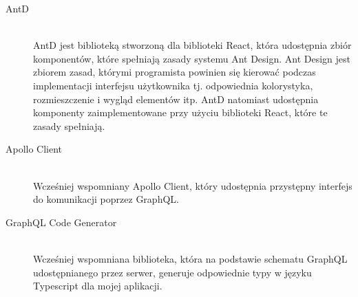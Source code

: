\begin{description}
  \item[AntD] \hfill \\ AntD jest biblioteką stworzoną dla biblioteki React, która udostępnia zbiór komponentów, które spełniają zasady systemu Ant Design. Ant Design jest zbiorem zasad, którymi programista powinien się kierować podczas implementacji interfejsu użytkownika tj. odpowiednia kolorystyka, rozmieszczenie i wygląd elementów itp. AntD natomiast udostępnia komponenty zaimplementowane przy użyciu biblioteki React, które te zasady spełniają.
  \item[Apollo Client] \hfill \\ Wcześniej wspomniany Apollo Client, który udostępnia przystępny interfejs do komunikacji poprzez GraphQL.
  \item[GraphQL Code Generator] \hfill \\ Wcześniej wspomniana biblioteka, która na podstawie schematu GraphQL udostępnianego przez serwer, generuje odpowiednie typy w języku Typescript dla mojej aplikacji.

\end{description}

